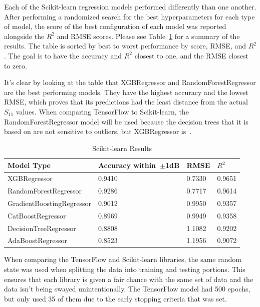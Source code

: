 \documentclass[lettersize,journal]{IEEEtran}
\begin{document}
Each of the Scikit-learn regression models performed differently than one another. After performing a randomized search for the best hyperparameters for each type of model, the score of the best configuration of each model was reported alongside the $R^2$ and RMSE scores. Please see Table~\ref{comparing_sklearn} for a summary of the results. The table is sorted by best to worst performance by score, RMSE, and $R^2$. The goal is to have the accuracy and $R^2$ closest to one, and the RMSE closest to zero. 

It's clear by looking at the table that XGBRegressor and RandomForestRegressor are the best performing models. They have the highest accuracy and the lowest RMSE, which proves that its predictions had the least distance from the actual $S_{11}$ values. When comparing TensorFlow to Scikit-learn, the RandomForestRegressor model will be used because the decision trees that it is based on are not sensitive to outliers, but XGBRegressor is~\cite{BROWN2009541,Li_2018}. 

\begin{table}[h]
\caption{Scikit-learn Results}
\begin{center}
\begin{tabular}{ |l|l|l|l| }
    \hline
    Model Type & Accuracy within~$\pm$1dB & RMSE & $R^2$ \\ 
    \hline
    XGBRegressor & 0.9410 & 0.7330 & 0.9651 \\  
    \hline
    RandomForestRegressor & 0.9286 & 0.7717 & 0.9614 \\
    \hline  
    GradientBoostingRegressor & 0.9012 & 0.9950 & 0.9357 \\
    \hline
    CatBoostRegressor & 0.8969 & 0.9949 & 0.9358 \\    
    \hline
    DecisionTreeRegressor & 0.8808 & 1.1082 & 0.9202 \\  
    \hline
    AdaBoostRegressor & 0.8523 & 1.1956 & 0.9072 \\  
    \hline
\end{tabular}
\end{center}
\label{comparing_sklearn}
\end{table}

When comparing the TensorFlow and Scikit-learn libraries, the same random state was used when splitting the data into training and testing portions. This ensures that each library is given a fair chance with the same set of data and the data isn't being swayed unintentionally. The TensorFlow model had 500 epochs, but only used 35 of them due to the early stopping criteria that was set. 
\end{document}
